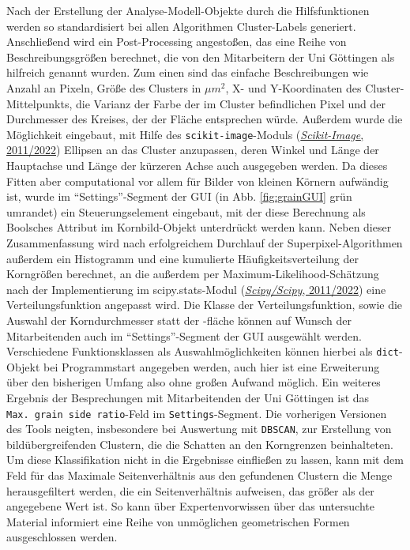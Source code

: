\documentclass[
  12pt,
  openany]{book}
\begin{document}
Nach der Erstellung der Analyse-Modell-Objekte durch die Hilfsfunktionen werden so standardisiert bei allen Algorithmen Cluster-Labels generiert. Anschließend wird ein Post-Processing angestoßen, das eine Reihe von Beschreibungsgrößen berechnet, die von den Mitarbeitern der Uni Göttingen als hilfreich genannt wurden. Zum einen sind das einfache Beschreibungen wie Anzahl an Pixeln, Größe des Clusters in \(\mu m^2\), X- und Y-Koordinaten des Cluster-Mittelpunkts, die Varianz der Farbe der im Cluster befindlichen Pixel und der Durchmesser des Kreises, der der Fläche entsprechen würde. Außerdem wurde die Möglichkeit eingebaut, mit Hilfe des \texttt{scikit-image}-Moduls (\protect\hyperlink{ref-ScikitimageImageProcessing2022}{\emph{Scikit-Image}, 2011/2022}) Ellipsen an das Cluster anzupassen, deren Winkel und Länge der Hauptachse und Länge der kürzeren Achse auch ausgegeben werden. Da dieses Fitten aber computational vor allem für Bilder von kleinen Körnern aufwändig ist, wurde im ``Settings''-Segment der GUI (in Abb. \ref{fig:grainGUI} grün umrandet) ein Steuerungselement eingebaut, mit der diese Berechnung als Boolsches Attribut im Kornbild-Objekt unterdrückt werden kann.
Neben dieser Zusammenfassung wird nach erfolgreichem Durchlauf der Superpixel-Algorithmen außerdem ein Histogramm und eine kumulierte Häufigkeitsverteilung der Korngrößen berechnet, an die außerdem per Maximum-Likelihood-Schätzung nach der Implementierung im scipy.stats-Modul (\protect\hyperlink{ref-ScipyScipy2022}{\emph{Scipy/Scipy}, 2011/2022}) eine Verteilungsfunktion angepasst wird. Die Klasse der Verteilungsfunktion, sowie die Auswahl der Korndurchmesser statt der -fläche können auf Wunsch der Mitarbeitenden auch im ``Settings''-Segment der GUI ausgewählt werden. Verschiedene Funktionsklassen als Auswahlmöglichkeiten können hierbei als \texttt{dict}-Objekt bei Programmstart angegeben werden, auch hier ist eine Erweiterung über den bisherigen Umfang also ohne großen Aufwand möglich. \newline
Ein weiteres Ergebnis der Besprechungen mit Mitarbeitenden der Uni Göttingen ist das \texttt{Max.\ grain\ side\ ratio}-Feld im \texttt{Settings}-Segment. Die vorherigen Versionen des Tools neigten, insbesondere bei Auswertung mit \texttt{DBSCAN}, zur Erstellung von bildübergreifenden Clustern, die die Schatten an den Korngrenzen beinhalteten. Um diese Klassifikation nicht in die Ergebnisse einfließen zu lassen, kann mit dem Feld für das Maximale Seitenverhältnis aus den gefundenen Clustern die Menge herausgefiltert werden, die ein Seitenverhältnis aufweisen, das größer als der angegebene Wert ist. So kann über Expertenvorwissen über das untersuchte Material informiert eine Reihe von unmöglichen geometrischen Formen ausgeschlossen werden.\newline
\end{document}
